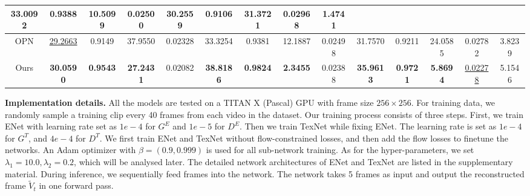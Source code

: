 \begin{table}[t]
{\begin{tabular}{c|c|c|c|c|c|c|c|c|c|c|c|c|c }
			33.0092 &  0.9388 &  10.5099 & 0.02500 & 
			
			30.2559 & 0.9106 & 31.3721 & 0.02968 
			& 1.4741
			\\
			
			\hline
			
			
			OPN \cite{oh2019onion} & \underline{29.2663} &0.9149 & 37.9550 &0.02328 &
			
			33.3254 & 0.9381  & 12.1887 &0.02498 &
			
			31.7570  & 0.9211 & 24.0585 
			&0.02782 &
			3.8239 \\
			
			
			\hline
			
			
			
			Ours &\textbf{30.0590} &\textbf{0.9543}&   \textbf{27.2431} & 0.02082 &
			\textbf{38.8186} & \textbf{0.9824} & \textbf{2.3455} & 0.02388 &
			\textbf{35.9613}  & \textbf{0.9721}&  \textbf{ 5.8694}  & \underline{0.02278}  &5.1546\\
			
			\hline
		\end{tabular}
	}
	\label{tab:sem}
\end{table}


\noindent \textbf{Implementation details.} 
All the models are tested on a TITAN X (Pascal) GPU with frame size $256 \times 256$.
For training data, we randomly sample a training clip every 40 frames from each video in the dataset. Our training process consists of three steps. First, we train ENet with learning rate set as $1e-4$ for $G^E$ and $1e-5$ for $D^E$. 
Then we train TexNet while fixing ENet. The learning rate is set as $1e-4$ for $G^T$, and $4e-4$ for $D^T$.
We first train ENet and TexNet without flow-constrained losses, and then add the flow losses to finetune the networks.
An Adam optimizer with $\beta=(0.9, 0.999)$ is used for all sub-network training.
As for the hyper-parameters, we set $\lambda_1=10.0,\lambda_2=0.2$, which will be analysed later. 
{\color{blue} The detailed network architectures of ENet and TexNet are listed in the supplementary material.
During inference, we sequentially feed frames into the network. The network takes 5 frames as input and output the reconstructed frame $\widetilde{V}_t$ in one forward pass.
}

